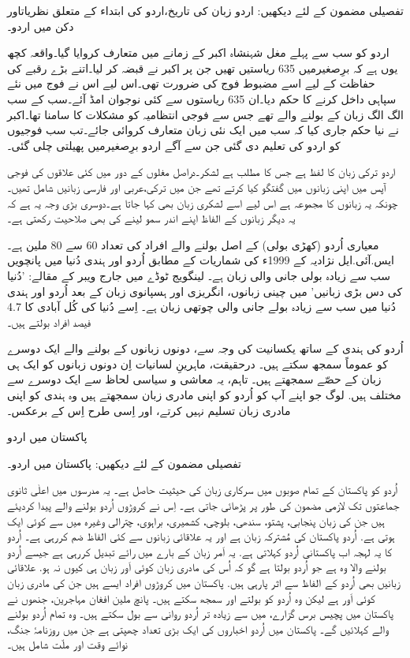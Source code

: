 \documentclass[a4paper]{article}
\begin{document}
\begin{flushright}
تفصیلی مضمون کے لئے دیکھیں: اردو زبان کی تاریخ،اردو کی ابتداء کے متعلق نظریاتاور دکن میں اردو۔

اردو کو سب سے پہلے مغل شہنشاہ اکبر کے زمانے میں متعارف کروایا گیا۔واقعہ کچھ یوں ہے کہ برِصغیرمیں 635 ریاستیں تھیں جن پر اکبر نے قبضہ کر لیا۔اتنے بڑے رقبے کی حفاظت کے لیے اسے مضبوط فوج کی ضرورت تھی۔اس لیے اس نے فوج میں نئے سپاہی داخل کرنے کا حکم دیا۔ان 635 ریاستوں سے کئی نوجوان امڈ آئے۔سب کے سب الگ الگ زبان کے بولنے والے تھے جس سے فوجی انتظامیہ کو مشکلات کا سامنا تھا۔اکبر نے نیا حکم جاری کیا کہ سب میں ایک نئی زبان متعارف کروائی جائے۔تب سب فوجیوں کو اردو کی تعلیم دی گئی جن سے آگے اردو برِصغیرمیں پھیلتی چلی گئی۔

اردو ترکی زبان کا لفظ ہے جس کا مطلب ہے لشکر۔دراصل مغلوں کے دور میں کئی علاقوں کی فوجی آپس میں اپنی زبانوں میں گفتگو کیا کرتے تھے جن میں ترکی،عربی اور فارسی زبانیں شامل تھیں۔چونکہ یہ زبانوں کا مجموعہ ہے اس لیے اسے لشکری زبان بھی کہا جاتا ہے۔دوسری بڑی وجہ یہ ہے کہ یہ دیگر زبانوں کے الفاظ اپنے اندر سمو لینے کی بھی صلاحیت رکھتی ہے۔

معیاری اُردو (کھڑی بولی) کے اصل بولنے والے افراد کی تعداد 60 سے 80 ملین ہے۔ ایس.آئی.ایل نژادیہ کے 1999ء کی شماریات کے مطابق اُردو اور ہندی دُنیا میں پانچویں سب سے زیادہ بولی جانی والی زبان ہے۔ لینگویج ٹوڈے میں جارج ویبر کے مقالے: 'دُنیا کی دس بڑی زبانیں' میں چینی زبانوں، انگریزی اور ہسپانوی زبان کے بعد اُردو اور ہندی دُنیا میں سب سے زیادہ بولے جانی والی چوتھی زبان ہے۔ اِسے دُنیا کی کُل آبادی کا 4.7 فیصد افراد بولتے ہیں۔

اُردو کی ہندی کے ساتھ یکسانیت کی وجہ سے، دونوں زبانوں کے بولنے والے ایک دوسرے کو عموماً سمجھ سکتے ہیں۔ درحقیقت، ماہرینِ لسانیات اِن دونوں زبانوں کو ایک ہی زبان کے حصّے سمجھتے ہیں۔ تاہم، یہ معاشی و سیاسی لحاظ سے ایک دوسرے سے مختلف ہیں. لوگ جو اپنے آپ کو اُردو کو اپنی مادری زبان سمجھتے ہیں وہ ہندی کو اپنی مادری زبان تسلیم نہیں کرتے، اور اِسی طرح اِس کے برعکس۔

پاکستان میں اردو

تفصیلی مضمون کے لئے دیکھیں: پاکستان میں اردو۔

اُردو کو پاکستان کے تمام صوبوں میں سرکاری زبان کی حیثیت حاصل ہے۔ یہ مدرسوں میں اعلٰی ثانوی جماعتوں تک لازمی مضمون کی طور پر پڑھائی جاتی ہے۔ اِس نے کروڑوں اُردو بولنے والے پیدا کردیئے ہیں جن کی زبان پنجابی، پشتو، سندھی، بلوچی، کشمیری، براہوی، چترالی وغیرہ میں سے کوئی ایک ہوتی ہے. اُردو پاکستان کی مُشترکہ زبان ہے اور یہ علاقائی زبانوں سے کئی الفاظ ضم کررہی ہے۔ اُردو کا یہ لہجہ اب پاکستانی اُردو کہلاتی ہے. یہ اَمر زبان کے بارے میں رائے تبدیل کررہی ہے جیسے اُردو بولنے والا وہ ہے جو اُردو بولتا ہے گو کہ اُس کی مادری زبان کوئی اَور زبان ہی کیوں نہ ہو. علاقائی زبانیں بھی اُردو کے الفاظ سے اثر پارہی ہیں. پاکستان میں کروڑوں افراد ایسے ہیں جن کی مادری زبان کوئی اَور ہے لیکن وہ اُردو کو بولتے اور سمجھ سکتے ہیں۔ پانچ ملین افغان مہاجرین، جنھوں نے پاکستان میں پچیس برس گزارے، میں سے زیادہ تر اُردو روانی سے بول سکتے ہیں۔ وہ تمام اُردو بولنے والے کہلائیں گے۔ پاکستان میں اُردو اخباروں کی ایک بڑی تعداد چھپتی ہے جن میں روزنامۂ جنگ، نوائے وقت اور ملّت شامل ہیں۔


\end{flushright}
\end{document}
